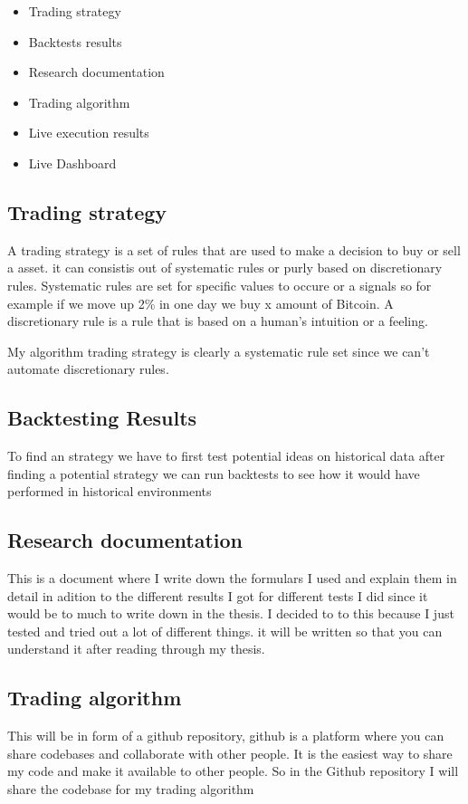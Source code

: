 \documentclass[12pt]{article}
\begin{document}
\begin{itemize}
    \item Trading strategy
    \item Backtests results
    \item Research documentation
    \item Trading algorithm
    \item Live execution results
    \item Live Dashboard

\end{itemize}



\subsection{Trading strategy}
A trading strategy is a set of rules that are used to make a decision to buy or sell a asset. it can consistis out of systematic rules or purly based on discretionary rules.
Systematic rules are set for specific values to occure or a signals so for example if we move up 2\% in one day we buy x amount of Bitcoin. A discretionary rule is a rule that is based on a human's intuition or a feeling.

My algorithm trading strategy is clearly a systematic rule set since we can't automate discretionary rules.

\subsection{Backtesting Results}
To find an strategy we have to first test potential ideas on historical data after finding a potential strategy we can run backtests to see how it would have performed in historical environments




\subsection{Research documentation}
This is a document where I write down the formulars I used and explain them in detail in adition to the different results I got for different tests I did since it would be to much to write down in the thesis. I decided to to this because I just tested and tried out a lot of different things. it will be written so that you can understand it after reading through my thesis.



\subsection{Trading algorithm}
This will be in form of a github repository, github is a platform where you can share codebases and collaborate with other people.
It is the easiest way to share my code and make it available to other people. So in the Github repository I will share the codebase for my trading algorithm
\end{document}
